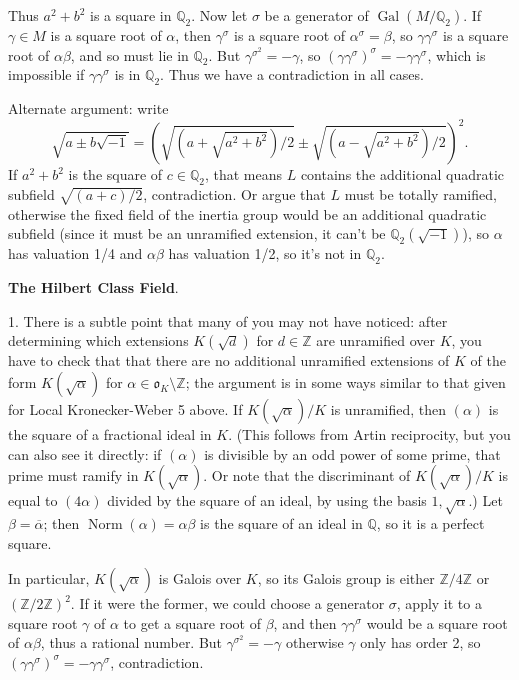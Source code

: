 \documentclass[12pt]{article}
\def\QQ{\mathbb{Q}}
\def\ZZ{\mathbb{Z}}
\def\gotho{\mathfrak{o}}
\DeclareMathOperator{\Gal}{Gal}
\DeclareMathOperator{\Norm}{Norm}
\def\head#1{\medskip \noindent \textbf{#1}.}
\begin{document}
Thus $a^2+b^2$ is a square in $\QQ_2$.
Now let $\sigma$ be a generator of $\Gal(M/\QQ_2)$. If $\gamma \in M$
is a square root of $\alpha$, then $\gamma^\sigma$ is a square root of
$\alpha^\sigma = \beta$, so $\gamma \gamma^\sigma$ is a square root of
$\alpha \beta$, and so must lie in $\QQ_2$. But $\gamma^{\sigma^2}
= -\gamma$, so $(\gamma \gamma^\sigma)^\sigma = -\gamma \gamma^\sigma$,
which is impossible if $\gamma \gamma^\sigma$ is in $\QQ_2$.
Thus we have a contradiction in all cases.

Alternate argument: write
\[
\sqrt{a \pm b \sqrt{-1}} =  \left(
\sqrt{(a + \sqrt{a^2+b^2})/2} \pm 
\sqrt{(a - \sqrt{a^2+b^2})/2} \right)^2.
\]
If $a^2+b^2$ is the square of $c \in \QQ_2$, that means $L$ contains 
the additional quadratic subfield $\sqrt{(a+c)/2}$, contradiction.
Or argue that $L$ must be totally ramified, otherwise the fixed field of
the inertia group would be an additional quadratic subfield (since
it must be an unramified extension, it can't be $\QQ_2(\sqrt{-1})$),
so $\alpha$ has valuation 1/4 and $\alpha \beta$ has valuation 1/2,
so it's not in $\QQ_2$.

\head{The Hilbert Class Field}

1. There is a subtle point that many of you may not have noticed: after
determining which extensions $K(\sqrt{d})$ for $d \in \ZZ$ are unramified
over $K$, you
have to check that that there are no additional unramified extensions of $K$
of the form $K(\sqrt{\alpha})$ for $\alpha \in \gotho_K \setminus \ZZ$; the
argument is in some ways similar to that given for Local Kronecker-Weber
5 above. If
$K(\sqrt{\alpha})/K$ is unramified, then $(\alpha)$ is the square of a
fractional ideal in $K$. (This follows from Artin reciprocity, but you can
also see it directly: if $(\alpha)$ is divisible by an odd power of some
prime, that prime must ramify in $K(\sqrt{\alpha})$. Or note that
the discriminant of $K(\sqrt{\alpha})/K$ is equal to $(4\alpha)$ divided
by the square of an ideal, by using the basis $1, \sqrt{\alpha}$.)
Let $\beta = \overline{\alpha}$; then $\Norm(\alpha) = \alpha \beta$
is the square of an ideal in $\QQ$, so it is a perfect square.

In particular, $K(\sqrt{\alpha})$ is Galois over $K$, so its Galois
group is either $\ZZ/4\ZZ$ or $(\ZZ/2\ZZ)^2$. If it were the former, we
could choose a generator $\sigma$, apply it to a square root $\gamma$
of $\alpha$ to get a square root of $\beta$, and then
$\gamma \gamma^\sigma$ would be a square root of $\alpha \beta$, thus
a rational number. But $\gamma^{\sigma^2} = -\gamma$ otherwise $\gamma$
only has order 2, so $(\gamma \gamma^\sigma)^\sigma = -\gamma \gamma^\sigma$,
contradiction.
\end{document}
